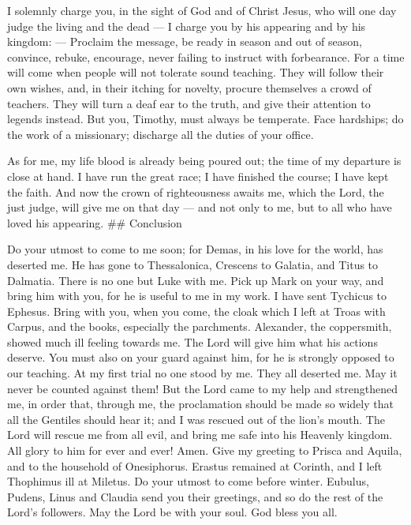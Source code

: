  I solemnly charge you, in the sight of God and of Christ
Jesus, who will one day judge the living and the dead --- I charge you
by his appearing and by his kingdom: ---  Proclaim the
message, be ready in season and out of season, convince, rebuke,
encourage, never failing to instruct with forbearance.  For
a time will come when people will not tolerate sound teaching. They will
follow their own wishes, and, in their itching for novelty, procure
themselves a crowd of teachers.  They will turn a deaf ear
to the truth, and give their attention to legends instead. 
But you, Timothy, must always be temperate. Face hardships; do the work
of a missionary; discharge all the duties of your office.

 As for me, my life blood is already being poured out; the
time of my departure is close at hand.  I have run the great
race; I have finished the course; I have kept the faith. 
And now the crown of righteousness awaits me, which the Lord, the just
judge, will give me on that day --- and not only to me, but to all who
have loved his appearing. \#\# Conclusion

 Do your utmost to come to me soon;  for Demas,
in his love for the world, has deserted me. He has gone to Thessalonica,
Crescens to Galatia, and Titus to Dalmatia.  There is no
one but Luke with me. Pick up Mark on your way, and bring him with you,
for he is useful to me in my work.  I have sent Tychicus to
Ephesus.  Bring with you, when you come, the cloak which I
left at Troas with Carpus, and the books, especially the parchments.
 Alexander, the coppersmith, showed much ill feeling
towards me. The Lord will give him what his actions deserve.
 You must also on your guard against him, for he is
strongly opposed to our teaching.  At my first trial no one
stood by me. They all deserted me. May it never be counted against them!
 But the Lord came to my help and strengthened me, in order
that, through me, the proclamation should be made so widely that all the
Gentiles should hear it; and I was rescued out of the lion's mouth.
 The Lord will rescue me from all evil, and bring me safe
into his Heavenly kingdom. All glory to him for ever and ever! Amen.
 Give my greeting to Prisca and Aquila, and to the
household of Onesiphorus.  Erastus remained at Corinth, and
I left Thophimus ill at Miletus.  Do your utmost to come
before winter. Eubulus, Pudens, Linus and Claudia send you their
greetings, and so do the rest of the Lord's followers.  May
the Lord be with your soul. God bless you all.
